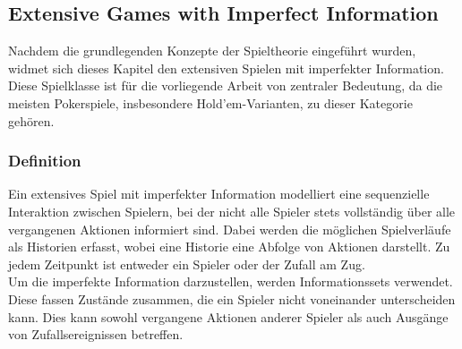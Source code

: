 \subsection{Extensive Games with Imperfect Information}
Nachdem die grundlegenden Konzepte der Spieltheorie eingeführt wurden, widmet sich dieses Kapitel den extensiven Spielen mit imperfekter Information.
Diese Spielklasse ist für die vorliegende Arbeit von zentraler Bedeutung, da die meisten Pokerspiele, insbesondere Hold'em-Varianten, zu dieser Kategorie gehören.

\subsubsection{Definition}
Ein extensives Spiel mit imperfekter Information modelliert eine sequenzielle Interaktion zwischen Spielern, bei der nicht alle Spieler stets vollständig über alle vergangenen Aktionen informiert sind. 
Dabei werden die möglichen Spielverläufe als Historien erfasst, wobei eine Historie eine Abfolge von Aktionen darstellt. 
Zu jedem Zeitpunkt ist entweder ein Spieler oder der Zufall am Zug. \\
Um die imperfekte Information darzustellen, werden Informationssets verwendet. 
Diese fassen Zustände zusammen, die ein Spieler nicht voneinander unterscheiden kann. 
Dies kann sowohl vergangene Aktionen anderer Spieler als auch Ausgänge von Zufallsereignissen betreffen.

